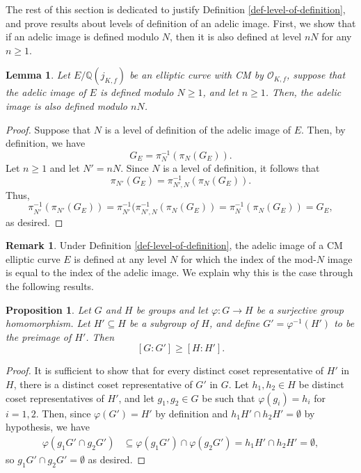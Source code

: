 \documentclass[11pt]{amsart}
\newtheorem{lemma}[defn]{Lemma}
\newtheorem{proposition}[defn]{Proposition}
\theoremstyle{definition}
\newtheorem{remark}[defn]{Remark}
\newcommand{\Q}{\mathbb{Q}}
\newcommand{\Of}{\mathcal{O}_{K,f}}
\begin{document}
The rest of this section is dedicated to justify Definition \ref{def-level-of-definition}, and prove results about levels of definition of an adelic image. First, we show that if an adelic image is defined modulo $N$, then it is also defined at level $nN$ for any $n\geq 1$.

\begin{lemma}\label{lem-levelup}
	Let $E/\Q(j_{K, f})$ be an elliptic curve with CM by $\Of$, suppose that the adelic image of $E$ is defined modulo $N\geq 1$, and let $n\geq 1$. Then, the adelic image is also defined modulo $nN$.
	\end{lemma}
	\begin{proof}
		Suppose that $N$ is a level of definition of the adelic image of $E$. Then, by definition, we have 
		\[ G_{E} = \pi_N^{-1}(\pi_N(G_{E})). \]
		Let $n\geq 1$ and let $N'=nN$. Since $N$ is a level of definition, it follows that 
		$$\pi_{N'}(G_E) = \pi_{N',N}^{-1}(\pi_N(G_E)).$$
		Thus,
		$$\pi_{N'}^{-1}(\pi_{N'}(G_E))= \pi_{N'}^{-1}(\pi_{N',N}^{-1}(\pi_N(G_E)) = \pi_{N}^{-1}(\pi_N(G_E))=G_E,$$
		as desired.
	\end{proof}

    

\begin{remark}
Under Definition \ref{def-level-of-definition}, the adelic image of a CM elliptic curve $E$ is defined at any level $N$ for which the index of the mod-$N$ image is equal to the index of the adelic image. We explain why this is the case through the following results.
\end{remark}

\begin{proposition}\label{prop-gen-surj-map}
    Let $G$ and $H$ be groups and let $\varphi \colon G \to H$ be a surjective group homomorphism. Let $H' \subseteq H$ be a subgroup of $H$, and define $G'= \varphi^{-1}(H')$ to be the preimage of $H'$.
    Then 
    \[ [G : G'] \geq [H : H'].\]
\end{proposition}

\begin{proof}
    It is sufficient to show that for every distinct coset representative of $H'$ in $H$, there is a distinct coset representative of $G'$ in $G$. Let $h_1, h_2 \in H$ be distinct coset representatives of $H'$, and let $g_1, g_2 \in G$ be such that $\varphi(g_i) = h_i$ for $i = 1, 2$. Then, since $\varphi(G') = H'$ by definition and $h_1 H' \cap h_2 H' = \emptyset$ by hypothesis, we have 
    \begin{align*}
        \varphi(g_1 G' \cap g_2 G') 
        &\subseteq \varphi(g_1 G') \cap \varphi(g_2 G') = h_1 H' \cap h_2 H' = \emptyset,
    \end{align*}    
    so $g_1 G' \cap g_2 G' = \emptyset$ as desired.
\end{proof}
\end{document}

